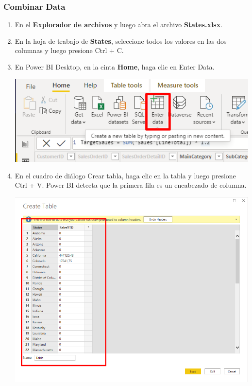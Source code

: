 \documentclass[12pt,letterpaper]{article}
\newcommand\tab[1][1cm]{\hspace*{#1}}
\begin{document}
    \subsubsection{Combinar Data}
    \begin{enumerate}[\tab 1.]
        \item En el \textbf{Explorador de archivos} y luego abra el archivo \textbf{States.xlsx}.
        \item En la hoja de trabajo de \textbf{States}, seleccione todos los valores en las dos columnas y luego presione Ctrl + C.
        \item En Power BI Desktop, en la cinta \textbf{Home}, haga clic en Enter Data.
        \begin{center}
            \includegraphics[width=13cm]{./img/img50.png}
        \end{center}
        \item En el cuadro de diálogo Crear tabla, haga clic en la tabla y luego presione Ctrl + V. Power BI detecta que la primera fila es un encabezado de columna.
        \begin{center}
            \includegraphics[width=13cm]{./img/img51.png}

\end{center}
\end{enumerate}
\end{document}
